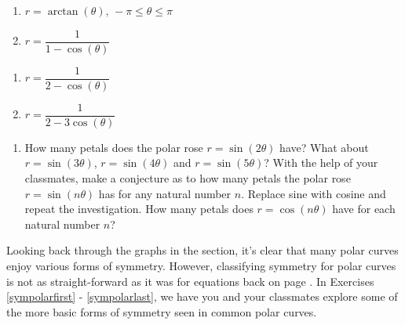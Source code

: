 \begin{multicols}{2} 

\begin{enumerate}

\setcounter{enumi}{\value{HW}}

\item $r = \arctan(\theta), \, -\pi \leq \theta \leq \pi$  
\item $r = \dfrac{1}{1 - \cos(\theta)}$

\setcounter{HW}{\value{enumi}}

\end{enumerate}

\end{multicols}

\begin{multicols}{2} 

\begin{enumerate}

\setcounter{enumi}{\value{HW}}

\item $r = \dfrac{1}{2 - \cos(\theta)}$
\item $r = \dfrac{1}{2 - 3\cos(\theta)}$ \label{polarcalclast}

\setcounter{HW}{\value{enumi}}

\end{enumerate}

\end{multicols}

\begin{enumerate}

\setcounter{enumi}{\value{HW}}

\item How many petals does the polar rose $r = \sin(2\theta)$ have?  What about $r = \sin(3\theta)$, $r = \sin(4\theta)$ and $r = \sin(5\theta)$?  With the help of your classmates, make a conjecture as to how many petals the polar rose $r = \sin(n\theta)$ has for any natural number $n$.  Replace sine with cosine and repeat the investigation.  How many petals does $r = \cos(n\theta)$ have for each natural number $n$?  

\setcounter{HW}{\value{enumi}}

\end{enumerate}

\label{polarsymmetry} 

Looking back through the graphs in the section, it's clear that many polar curves enjoy various forms of symmetry.  However, classifying symmetry for polar curves is not as straight-forward as it was for equations back on page \pageref{symmetrytestequations}.  In Exercises \ref{sympolarfirst} - \ref{sympolarlast}, we have you and your classmates explore some of the more basic forms of symmetry seen in common polar curves.

